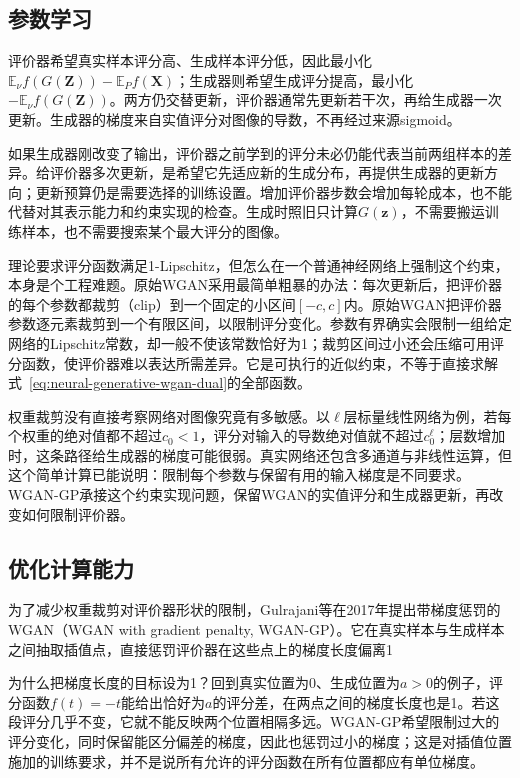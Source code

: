 \subsection{参数学习}
\label{sec:neural-generative-wgan-learning}

评价器希望真实样本评分高、生成样本评分低，因此最小化$\mathbb{E}_{\nu}f(G(\bm{Z}))-\mathbb{E}_{P}f(\bm{X})$；生成器则希望生成评分提高，最小化$-\mathbb{E}_{\nu}f(G(\bm{Z}))$。两方仍交替更新，评价器通常先更新若干次，再给生成器一次更新。生成器的梯度来自实值评分对图像的导数，不再经过来源sigmoid。

如果生成器刚改变了输出，评价器之前学到的评分未必仍能代表当前两组样本的差异。给评价器多次更新，是希望它先适应新的生成分布，再提供生成器的更新方向；更新预算仍是需要选择的训练设置。增加评价器步数会增加每轮成本，也不能代替对其表示能力和约束实现的检查。生成时照旧只计算$G(\bm{z})$，不需要搬运训练样本，也不需要搜索某个最大评分的图像。

理论要求评分函数满足1-Lipschitz，但怎么在一个普通神经网络上强制这个约束，本身是个工程难题。原始WGAN采用最简单粗暴的办法：每次更新后，把评价器的每个参数都裁剪（clip）到一个固定的小区间$[-c,c]$内。原始WGAN把评价器参数逐元素裁剪到一个有限区间，以限制评分变化。参数有界确实会限制一组给定网络的Lipschitz常数，却一般不使该常数恰好为1；裁剪区间过小还会压缩可用评分函数，使评价器难以表达所需差异。它是可执行的近似约束，不等于直接求解式~\eqref{eq:neural-generative-wgan-dual}的全部函数。

权重裁剪没有直接考察网络对图像究竟有多敏感。以$\ell$层标量线性网络为例，若每个权重的绝对值都不超过$c_0<1$，评分对输入的导数绝对值就不超过$c_0^\ell$；层数增加时，这条路径给生成器的梯度可能很弱。真实网络还包含多通道与非线性运算，但这个简单计算已能说明：限制每个参数与保留有用的输入梯度是不同要求。WGAN-GP承接这个约束实现问题，保留WGAN的实值评分和生成器更新，再改变如何限制评价器。

\subsection{优化计算能力}
\label{sec:neural-generative-wgan-computation-extension}

为了减少权重裁剪对评价器形状的限制，Gulrajani等在2017年提出带梯度惩罚的WGAN（WGAN with gradient penalty, WGAN-GP）。它在真实样本与生成样本之间抽取插值点，直接惩罚评价器在这些点上的梯度长度偏离1

为什么把梯度长度的目标设为1？回到真实位置为0、生成位置为$a>0$的例子，评分函数$f(t)=-t$能给出恰好为$a$的评分差，在两点之间的梯度长度也是1。若这段评分几乎不变，它就不能反映两个位置相隔多远。WGAN-GP希望限制过大的评分变化，同时保留能区分偏差的梯度，因此也惩罚过小的梯度；这是对插值位置施加的训练要求，并不是说所有允许的评分函数在所有位置都应有单位梯度。

